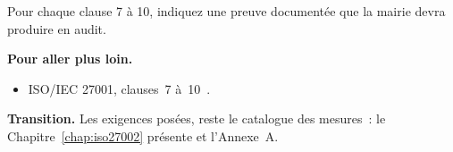 \begin{boxexo}[title={\ding{45}\quad Exercice~9.10. Tableau clauses-preuves \niveauexpert}]
Pour chaque clause 7 à 10, indiquez une preuve documentée que la mairie devra
produire en audit.
\end{boxexo}

\bigskip

\begin{boxinfo}
\textbf{Pour aller plus loin.}
\begin{itemize}
    \item ISO/IEC 27001, clauses~7 à~10~\cite{iso27001}.
\end{itemize}
\end{boxinfo}

\begin{boxinfo}
\textbf{Transition.} Les exigences posées, reste le catalogue des mesures~: le
Chapitre~\ref{chap:iso27002} présente  et l'Annexe~A.
\end{boxinfo}
